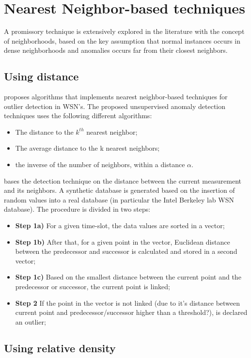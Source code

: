 \section{Nearest Neighbor-based techniques}
\label{sec:nnbased}

A promissory technique is extensively explored in the literature with the concept of neighborhoods, based on the key assumption that normal instances occurs in dense neighborhoods and anomalies occurs far from their closest neighbors.


\subsection{Using distance}

\cite{class:branch:2006} proposes algorithms that implements nearest neighbor-based techniques for outlier detection in WSN's. The proposed unsupervised anomaly detection techniques uses the following different algorithms:

\begin{itemize}
	\setlength\itemsep{-0.5em}
	\item The distance to the $k^{th}$ nearest neighbor;
	\item The average distance to the k nearest neighbors;
	\item the inverse of the number of neighbors, within a distance $\alpha$.	
\end{itemize}

\cite{nn:abid:2016} bases the detection technique on the distance between the current measurement and its neighbors. A synthetic database is generated based on the insertion of random values into a real database (in particular the Intel Berkeley lab WSN database).
The procedure is divided in two steps: 
\begin{itemize}
	\setlength\itemsep{-0.5em}
	\item \textbf{Step 1a)} For a given time-slot, the data values are sorted in a vector;
	\item \textbf{Step 1b)} After that, for a given point in the vector, Euclidean distance between the predecessor and successor is calculated and stored in a second vector;
	\item \textbf{Step 1c)} Based on the smallest distance between the current point and the predecessor or successor, the current point is linked;
	\item \textbf{Step 2} If the point in the vector is not linked (due to it's distance between current point and predecessor/successor higher than a threshold?), is declared an outlier;
\end{itemize}


\subsection{Using relative density}
\lipsum[1]